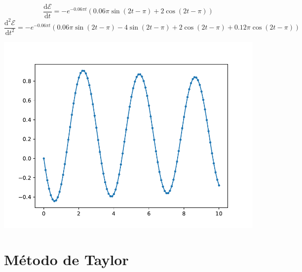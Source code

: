 \documentclass[a4paper, 11pt]{report}
\begin{document}
\begin{enumerate}[leftmargin=*, label=\textbf{\arabic*.}]
    \[
        \frac{\mathrm{d} \mathcal{E}}{\mathrm{d}t} = -e^{-0.06\pi t}(0.06\pi \sin(2t- \pi) + 2\cos(2t- \pi))
    \]
    \[
        \frac{\mathrm{d}^2 \mathcal{E}}{\mathrm{d}t^2} = -e^{-0.06\pi t}(0.06\pi \sin(2t - \pi) - 4\sin(2t - \pi) + 2\cos(2t - \pi) + 0.12\pi \cos(2t - \pi))
    \]
    \begin{center}
        \includegraphics[width=0.75\columnwidth]{../metodo de euler/q16.pdf}
    \end{center}
\end{enumerate}

\section{Método de Taylor}
\end{document}
